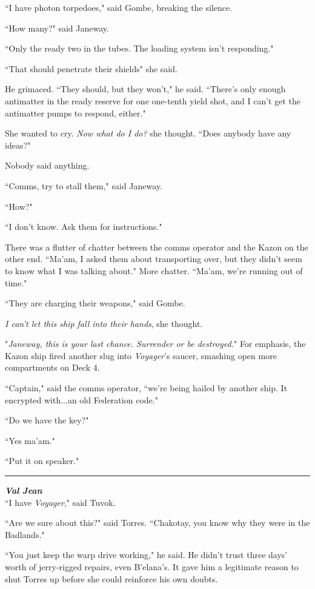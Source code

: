 \documentclass[twoside,letterpaper,12pt]{memoir}
\begin{document}
``I have photon torpedoes," said Gombe, breaking the silence.

``How many?" said Janeway.

``Only the ready two in the tubes. The loading system isn't responding."

``That should penetrate their shields" she said.

He grimaced. ``They should, but they won't," he said. ``There's only enough antimatter in the ready reserve for one one-tenth yield shot, and I can't get the antimatter pumps to respond, either."

She wanted to cry. \textit{Now what do I do?} she thought. ``Does anybody have any ideas?"

Nobody said anything.

``Comms, try to stall them," said Janeway.

``How?"

``I don't know. Ask them for instructions."

There was a flutter of chatter between the comms operator and the Kazon on the other end. ``Ma'am, I asked them about transporting over, but they didn't seem to know what I was talking about." More chatter. ``Ma'am, we're running out of time."

``They are charging their weapons," said Gombe.

\textit{I can't let this ship fall into their hands}, she thought.

"\textit{Janeway, this is your last chance. Surrender or be destroyed.}" For emphasis, the Kazon ship fired another slug into \textit{Voyager}'s saucer, smashing open more compartments on Deck 4.

``Captain," said the comms operator, ``we're being hailed by another ship. It encrypted with...an old Federation code."

``Do we have the key?"

``Yes ma'am."

``Put it on speaker."

\begin{center}\rule{3cm}{0.4 pt}\end{center}

\noindent\textit{\textbf{Val Jean}}\\

``I have \textit{Voyager}," said Tuvok.

``Are we sure about this?" said Torres. ``Chakotay, you know why they were in the Badlands."

``You just keep the warp drive working," he said. He didn't trust three days' worth of jerry-rigged repairs, even B'elana's. It gave him a legitimate reason to shut Torres up before she could reinforce his own doubts.
\end{document}
